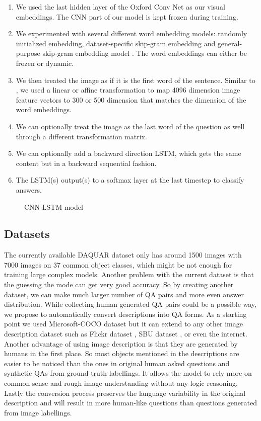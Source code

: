 \documentclass{article}
\renewcommand{\#}[1]{\textbf{#1}}
\begin{document}
\begin{enumerate}
    \item We used the last hidden layer of the Oxford Conv Net \cite{simonyan14} as our visual embeddings. The CNN part of our model is kept frozen during training.
    \item We experimented with several different word embedding models: randomly initialized embedding, dataset-specific skip-gram embedding and general-purpose skip-gram embedding model \cite{mikolov13}. The word embeddings can either be frozen or dynamic.
    \item We then treated the image as if it is the first word of the sentence. Similar to \cite{frome13}, we used a linear or affine transformation to map 4096 dimension image feature vectors to 300 or 500 dimension that matches the dimension of the word embeddings.
    \item We can optionally treat the image as the last word of the question as well through a different transformation matrix.
    \item We can optionally add a backward direction LSTM, which gets the same content but in a backward sequential fashion.
    \item The LSTM(s) output(s) to a softmax layer at the last timestep to classify answers.
\end{enumerate}

\begin{figure}
\centering
\scalebox{0.7}{
}
\caption{CNN-LSTM model}
\label{fig:imgword}
\end{figure}

\subsection{Datasets}
The currently available DAQUAR dataset only has around 1500 images with 7000 images on 37 common object classes, which might be not enough for training large complex models. Another problem with the current dataset is that the guessing the mode can get very good accuracy. So by creating another dataset, we can make much larger number of QA pairs and more even answer distribution. While collecting human generated QA pairs could be a possible way, we propose to automatically convert descriptions into QA forms. As a starting point we used Microsoft-COCO dataset \cite{mscoco} but it can extend to any other image description dataset such as Flickr dataset \cite{flickr8k}, SBU dataset \cite{ordonez11}, or even the internet. Another advantage of using image description is that they are generated by humans in the first place. So most objects mentioned in the descriptions are easier to be noticed than the ones in original human asked questions and synthetic QAs from ground truth labellings. It allows the model to rely more on common sense and rough image understanding without any logic reasoning. Lastly the conversion process preserves the language variability in the original description and will result in more human-like questions than questions generated from image labellings.
\end{document}
